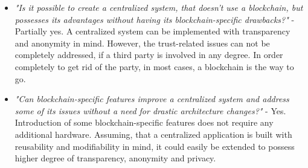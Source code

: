 \begin{itemize}
\item \textit{"Is it possible to create a centralized system, that doesn't use a blockchain, but possesses its advantages without having its blockchain-specific drawbacks?"} - Partially yes. A centralized system can be implemented with transparency and anonymity in mind. However, the trust-related issues can not be completely addressed, if a third party is involved in any degree. In order completely to get rid of the party, in most cases, a blockchain is the way to go.

\item \textit{"Can blockchain-specific features improve a centralized system and address some of its issues without a need for drastic architecture changes?"} - Yes. Introduction of some blockchain-specific features does not require any additional hardware. Assuming, that a centralized application is built with reusability and modifiability in mind, it could easily be extended to possess higher degree of transparency, anonymity and privacy.
\end{itemize}




